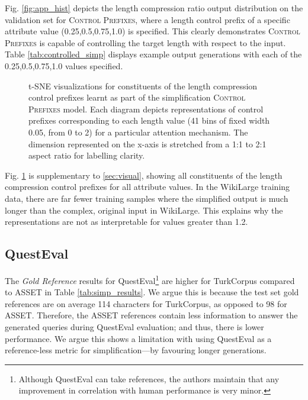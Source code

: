\documentclass[11pt]{article}
\newcommand{\control}{\textsc{Control Prefixes}\xspace}
\begin{document}
Fig. \ref{fig:app_hist} depicts the length compression ratio output distribution on the validation set for \control, where a length control prefix of a specific attribute value (0.25,0.5,0.75,1.0) is specified. This clearly demonstrates \control is capable of controlling the target length with respect to the input. Table \ref{tab:controlled_simp} displays example output generations with each of the 0.25,0.5,0.75,1.0 values specified.





\begin{figure}[h]
    \centering
    \qquad
    \qquad

    \caption{t-SNE visualizations for constituents of the length compression control prefixes learnt as part of the simplification \control model. Each diagram depicts representations of control prefixes corresponding to each length value (41 bins of fixed width 0.05, from 0 to 2) for a particular attention mechanism. The dimension represented on the x-axis is stretched from a 1:1 to 2:1 aspect ratio for labelling clarity.}\label{fig:appen_tsne}\end{figure}

Fig. \ref{fig:appen_tsne} is supplementary to \cref{sec:visual}, showing all constituents of the length compression control prefixes for all attribute values. In the WikiLarge training data, there are far fewer training samples where the simplified output is much longer than the complex, original input in WikiLarge. This explains why the representations are not as interpretable for values greater than 1.2. 





\subsection{QuestEval}
The \emph{Gold Reference} results for QuestEval\footnote{Although QuestEval can take references, the authors maintain that any improvement in correlation
with human performance is very minor.} are higher for TurkCorpus compared to ASSET in Table \ref{tab:simp_results}. We argue this is because the test set gold references are on average 114 characters for TurkCorpus, as opposed to 98 for ASSET. Therefore, the ASSET references contain less information to answer the generated queries during QuestEval evaluation; and thus, there is lower performance. We argue this shows a limitation with using QuestEval as a reference-less metric for simplification—by favouring longer generations. 
\end{document}
